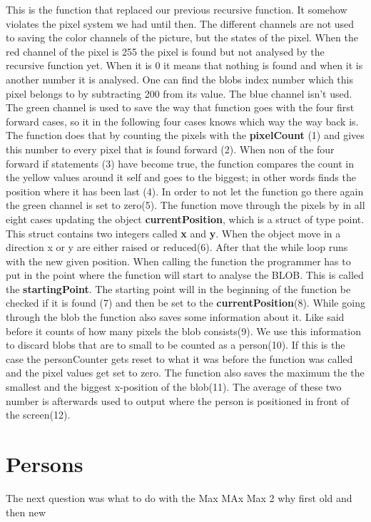This is the function that replaced our previous recursive function. It somehow violates the pixel system we had until then. The different channels are not used to saving the color channels of the picture, but the states of the pixel. When the red channel of the pixel is 255 the pixel is found but not analysed by the recursive function yet. When it is 0 it means that nothing is found and when it is another number it is analysed. One can find the blobs index number which this pixel belongs to by subtracting 200 from its value. The blue channel isn't used. The green channel is used to save the way that function goes with the four first forward cases, so it in the following four cases knows which way the way back is. The function does that by counting the pixels with the \textbf{pixelCount} (1) and gives this number to every pixel that is found forward (2). When non of the four forward if statements (3) have become true, the function compares the count in the yellow values around it self and goes to the biggest; in other words finds the position where it has been last (4). In order to not let the function go there again the green channel is set to zero(5). The function move through the pixels by in all eight cases updating the object \textbf{currentPosition}, which is a struct of type point. This struct contains two integers called \textbf{x} and \textbf{y}. When the object move in a direction x or y are either raised or reduced(6). After that the while loop runs with the new given position. When calling the function the programmer has to put in the point where the function will start to analyse the BLOB. This is called the \textbf{startingPoint}. The starting point will in the beginning of the function be checked if it is found (7) and then be set to the \textbf{currentPosition}(8). While going through the blob the function also saves some information about it. Like said before it counts of how many pixels the blob consists(9). We use this information to discard blobs that are to small to be counted as a person(10). If this is the case the personCounter gets reset to what it was before the function was called and the pixel values get set to zero. The function also saves the maximum the the smallest and the biggest x-position of the blob(11). The average of these two number is afterwards used to output where the person is positioned in front of the screen(12).

\section{Persons}
The next question was what to do with the 
Max MAx Max 2 
why first old and then new
